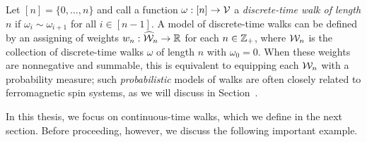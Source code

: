 Let $[n] = \{0,\ldots,n\}$ and call a function $\omega : [n]\rightarrow\mathcal{V}$
a \emph{discrete-time walk of length $n$} if $\omega_i \sim \omega_{i+1}$ for all
$i\in[n-1]$.
A model of discrete-time walks can be defined by an assigning of weights
$w_n : \widehat{\mathcal{W}}_n \rightarrow {\mathbb R}$ for each $n \in {\mathbb Z}_+$, where $\mathcal{W}_n$ is the
collection of discrete-time walks $\omega$ of length $n$ with $\omega_0 = 0$.
When these weights are nonnegative and summable, this is equivalent to
equipping each $\mathcal{W}_n$ with a probability measure; such \emph{probabilistic}
models of walks are often closely related to ferromagnetic spin systems,
as we will discuss in Section~\REF.

In this thesis, we focus on continuous-time walks, which we define in the next
section. Before proceeding, however, we discuss the following important example.

